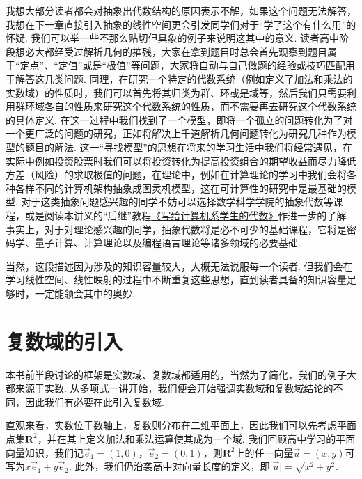 我想大部分读者都会对抽象出代数结构的原因表示不解，如果这个问题无法解答，我想在下一章直接引入抽象的线性空间更会引发同学们对于``学了这个有什么用''的怀疑. 我们可以举一些不那么贴切但具象的例子来说明这其中的意义. 读者高中阶段想必大都经受过解析几何的摧残，大家在拿到题目时总会首先观察到题目属于``定点''、``定值''或是``极值''等问题，大家将自动与自己做题的经验或技巧匹配用于解答这几类问题. 同理，在研究一个特定的代数系统（例如定义了加法和乘法的实数域）的性质时，我们可以首先将其归类为群、环或是域等，然后我们只需要利用群环域各自的性质来研究这个代数系统的性质，而不需要再去研究这个代数系统的具体定义. 在这一过程中我们找到了一个模型，即将一个孤立的问题转化为了对一个更广泛的问题的研究，正如将解决上千道解析几何问题转化为研究几种作为模型的题目的解法. 这一``寻找模型''的思想在将来的学习生活中我们将经常遇见，在实际中例如投资股票时我们可以将投资转化为提高投资组合的期望收益而尽力降低方差（风险）的求取极值的问题，在理论中，例如在计算理论的学习中我们会将各种各样不同的计算机架构抽象成图灵机模型，这在可计算性的研究中是最基础的模型. 对于这类抽象问题感兴趣的同学不妨可以选择数学科学学院的抽象代数等课程，或是阅读本讲义的``后继''教程\href{https://frightenedfoxcn.github.io/notes/series/alg-for-cs/}{《写给计算机系学生的代数》}作进一步的了解. 事实上，对于对理论感兴趣的同学，抽象代数将是必不可少的基础课程，它将是密码学、量子计算、计算理论以及编程语言理论等诸多领域的必要基础.

当然，这段描述因为涉及的知识容量较大，大概无法说服每一个读者. 但我们会在学习线性空间、线性映射的过程中不断重复这些思想，直到读者具备的知识容量足够时，一定能领会其中的奥妙.

\section{复数域的引入}

本书前半段讨论的框架是实数域、复数域都适用的，当然为了简化，我们的例子大都来源于实数. 从多项式一讲开始，我们便会开始强调实数域和复数域结论的不同，因此我们有必要在此引入复数域.

直观来看，实数位于数轴上，复数则分布在二维平面上，因此我们可以先考虑平面点集$\mathbf{R}^2$，并在其上定义加法和乘法运算使其成为一个域. 我们回顾高中学习的平面向量知识，我们记$\vec{e}_1=(1,0)$，$\vec{e}_2=(0,1)$，则$\mathbf{R}^2$上的任一向量$\vec{u}=(x,y)$可写为$x\vec{e}_1+y\vec{e}_2$. 此外，我们仍沿袭高中对向量长度的定义，即$\lvert\vec{u}\rvert=\sqrt{x^2+y^2}$.

